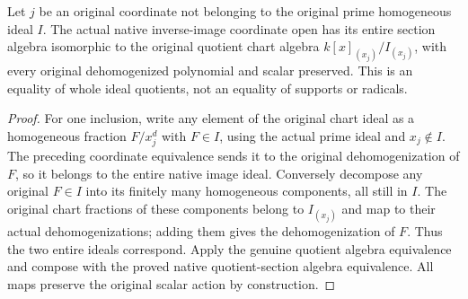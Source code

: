 \begin{lemma}
\label{lem:c0n-family-original-chart-quotient}
\leanok
{}
Let $j$ be an original coordinate not belonging to the original prime
homogeneous ideal $I$. The actual native inverse-image coordinate open
has its entire section algebra isomorphic to the original quotient chart
algebra $k[x]_{(x_j)}/I_{(x_j)}$, with every original dehomogenized
polynomial and scalar preserved. This is an equality of whole ideal
quotients, not an equality of supports or radicals.
\end{lemma}
\begin{proof}
For one inclusion, write any element of the original chart ideal as a
homogeneous fraction $F/x_j^d$ with $F\in I$, using the actual prime ideal
and $x_j\notin I$. The preceding coordinate equivalence sends it to the
original dehomogenization of $F$, so it belongs to the entire native
image ideal. Conversely decompose any original $F\in I$ into its finitely
many homogeneous components, all still in $I$. The original chart
fractions of these components belong to $I_{(x_j)}$ and map to their
actual dehomogenizations; adding them gives the dehomogenization of $F$.
Thus the two entire ideals correspond. Apply the genuine quotient
algebra equivalence and compose with the proved native quotient-section
algebra equivalence. All maps preserve the original scalar action by
construction.
\end{proof}

